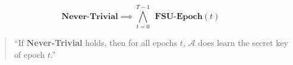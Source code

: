 \begin{LTL}
\[
    \textbf{Never-Trivial} \implies \bigwedge\limits_{t=0}^{T-1} \;\,\textbf{FSU-Epoch}(t)
\]
\begin{quotation}
``If \textbf{Never-Trivial} holds, then for all epochs \(t\), \(\mathcal{A}\) does learn the secret key of epoch \(t\).''
\end{quotation}\\
\end{LTL}
